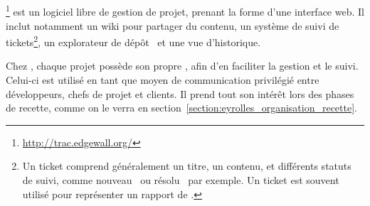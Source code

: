 \subsection{\atrac}
\label{section:outils_trac}

\atrac\footnote{\url{http://trac.edgewall.org/}} est un logiciel libre de gestion de projet, prenant la forme d'une interface web. Il inclut notamment un wiki pour partager du contenu, un système de suivi de tickets\footnote{Un ticket comprend généralement un titre, un contenu, et différents statuts de suivi, comme \og nouveau \fg\ ou \og résolu \fg\ par exemple. Un ticket est souvent utilisé pour représenter un rapport de \abug.}, un explorateur de dépôt \asvn\ et une vue d'historique.

Chez \asl, chaque projet possède son propre \atrac, afin d'en faciliter la gestion et le suivi. Celui-ci est utilisé en tant que moyen de communication privilégié entre développeurs, chefs de projet et clients. Il prend tout son intérêt lors des phases de recette, comme on le verra en section~\ref{section:eyrolles_organisation_recette}.
